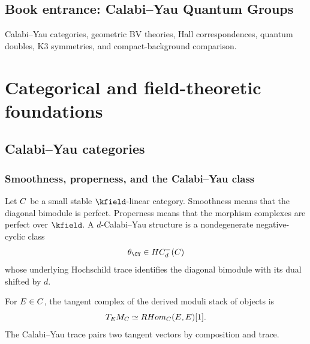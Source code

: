 \cleardoublepage
{}
{}
\chapter*{Book entrance: Calabi--Yau Quantum Groups}
\begin{summarybox}
Calabi--Yau categories, geometric BV theories, Hall correspondences, quantum doubles, K3 symmetries, and compact-background comparison.
\end{summarybox}
\part{Categorical and field-theoretic foundations}
















\chapter{Calabi--Yau categories}
\section{Smoothness, properness, and the Calabi--Yau class}
Let $C$ be a small stable $\kfield$-linear category. Smoothness means that the diagonal bimodule is perfect. Properness means that the morphism complexes are perfect over $\kfield$. A $d$-Calabi--Yau structure is a nondegenerate negative-cyclic class
\[
 \theta_{\CY}\in HC^-_d(\Ccal)
\]
whose underlying Hochschild trace identifies the diagonal bimodule with its dual shifted by $d$.

For $E\in C$, the tangent complex of the derived moduli stack of objects is
\[
 T_EM_{C}\simeq RHom_{C}(E,E)[1].
\]
The Calabi--Yau trace pairs two tangent vectors by composition and trace.

